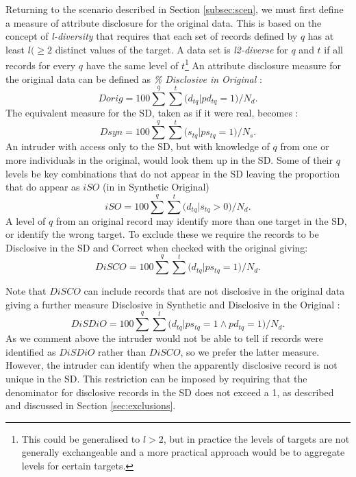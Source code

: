 \documentclass[12pt]{article}
\begin{document}
Returning to the scenario described in Section \ref{subsec:scen}, we must first define a measure of attribute disclosure for the original data. This is based on the concept of \textit{l-diversity} \cite{ldiv} that requires that each set of records defined by $q$ has at least $l(\ge{2}$ distinct values of the target. A data set is \textit{l2-diverse} for $q$ and $t$ if all records for every $q$ have the same level of $t$\footnote{This could be generalised to $l>2$, but in practice the levels of targets are not generally exchangeable and a more practical approach would be to aggregate levels for certain targets.} An attribute disclosure measure for the original data can be defined as \textit{\% Disclosive in Original} :
\begin{equation}
 Dorig = 100\sum^q{\sum^t{(d_{tq} |pd_{tq} = 1})}/N_d.
\end{equation}
The equivalent measure for the SD, taken as if it were real, becomes :
\begin{equation}
 Dsyn = 100\sum^q{\sum^t{(s_{tq} |ps_{tq} = 1})}/N_s.
\end{equation}
An intruder with access only to the SD, but with knowledge of $q$ from one or more individuals in the original, would look them up in the SD. Some of their $q$ levels be key combinations that do not appear in the SD
leaving the proportion that do appear as $iSO$ (in in Synthetic Original) 
\begin{equation}
 iSO = 100\sum^q{\sum^t{(d_{tq} | s_{tq}>0} )}/N_d.
\end{equation}
A level of $q$ from an original record may identify more than one target in the SD, or identify the wrong target.
To exclude these we require the records to be Disclosive in  the SD and Correct when checked 
with the original giving:
\begin{equation}
 DiSCO = 100\sum^q{\sum^t{(d_{tq} | ps_{tq} = 1}  )}/N_d.
\end{equation}

Note that $DiSCO$ can include records that are not disclosive in the original data giving a further 
measure Disclosive in Synthetic and Disclosive in the  Original :
\begin{equation}
DiSDiO = 100\sum^q{\sum^t{(d_{tq} | ps_{tq} = 1 \land pd_{tq} = 1}  ) }/N_d.
  \end{equation}
As we comment above the intruder would not be able to tell if records were 
identified as $DiSDiO$ rather than $DiSCO$, so we prefer the latter measure.
However, the intruder can identify when the apparently disclosive record
is not unique in the SD. 
 This restriction can be imposed by requiring that the denominator for disclosive records in the SD does not exceed a 1,  as described
 and discussed in Section \ref{sec:exclusions}.
\end{document}
